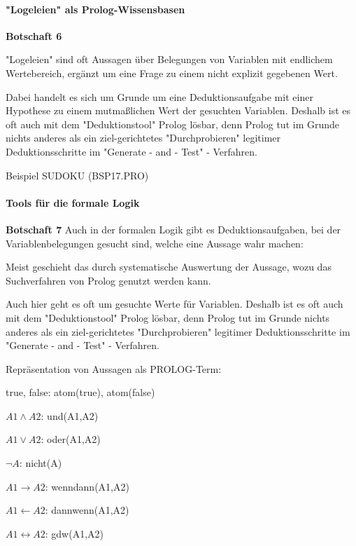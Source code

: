 \documentclass[a4paper]{article}
\renewcommand{\note}[2]{\begin{noteBox} \textbf{#1} #2 \end{noteBox}}
\begin{document}
\begin{multicols}{3}
  \paragraph{"Logeleien" als Prolog-Wissensbasen}
  \note{Botschaft 6}{
    \begin{enumerate*}
      \item "Logeleien" sind oft Aussagen über Belegungen von Variablen mit endlichem Wertebereich, ergänzt um eine Frage zu einem nicht explizit gegebenen Wert.
      \item Dabei handelt es sich um Grunde um eine Deduktionsaufgabe mit einer Hypothese zu einem mutmaßlichen Wert der gesuchten Variablen. Deshalb ist es oft auch mit dem "Deduktionstool" Prolog lösbar, denn Prolog tut im Grunde nichts anderes als ein ziel-gerichtetes "Durchprobieren" legitimer Deduktionsschritte im "Generate - and - Test" - Verfahren.
    \end{enumerate*}
  }


  Beispiel SUDOKU (BSP17.PRO)

  \paragraph{Tools für die formale Logik}
  \note{Botschaft 7}{Auch in der formalen Logik gibt es Deduktionsaufgaben, bei der Variablenbelegungen gesucht sind, welche eine Aussage wahr machen:
    \begin{enumerate*}
      \item Meist geschieht das durch systematische Auswertung der Aussage, wozu das Suchverfahren von Prolog genutzt werden kann.
      \item Auch hier geht es oft um gesuchte Werte für Variablen. Deshalb ist es oft auch mit dem "Deduktionstool" Prolog lösbar, denn Prolog tut im Grunde nichts anderes als ein ziel-gerichtetes "Durchprobieren" legitimer Deduktionsschritte im "Generate - and - Test" - Verfahren.
    \end{enumerate*}
  }

  Repräsentation von Aussagen als PROLOG-Term:
  \begin{itemize*}
    \item true, false: atom(true), atom(false)
    \item $A1\wedge A2$: und(A1,A2)
    \item $A1\vee A2$: oder(A1,A2)
    \item $\lnot A$: nicht(A)
    \item $A1\rightarrow A2$: wenndann(A1,A2)
    \item $A1\leftarrow A2$: dannwenn(A1,A2)
    \item $A1\leftrightarrow A2$: gdw(A1,A2)
  \end{itemize*}


\end{multicols}
\end{document}

